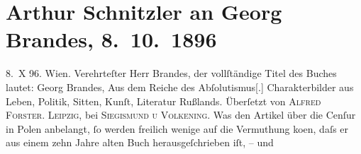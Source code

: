 

         
         \renewcommand{\erwaehntePersonen}{Personen: Hermann Bahr, Georg Brandes, Alfred Forster}
         \renewcommand{\erwaehnteInstitutionen}{Institutionen: Die Zeit. Wiener Wochenschrift, Siegismund u Volkening}
         \renewcommand{\erwaehnteOrte}{Orte: Deutschland, Dänemark, Polen, Wien}
         \renewcommand{\erwaehnteWerke}{Werke: Censur in Polen, Eindrücke aus Russland}
               \section[Arthur Schnitzler an Georg Brandes, 8. 10. 1896]{ Arthur Schnitzler an Georg Brandes, 8. 10. 1896}\nopagebreak{}\rehead{ }\begin{ledgroupsized}[t]{13cm}\normalsize\beginnumbering \toendnotes[C]{\smallbreak\pagebreak[2]} 
\toendnotes[C]{\smallbreak}\pstart
           \raggedleft{}{\pb}8. X 96. Wien.\pend
           \pstart\center{}Verehrteſter Herr Brandes,\pend\pstart
           der vollſtändige Titel des Buches lautet:\pend
           \pstart
           Georg Brandes, Aus dem Reiche des
                     Abſolutismus{[}.{]} Charakterbilder aus  Leben, Politik, Sitten, Kunſt, Literatur
                  Rußlands. Überſetzt von \textsc{Alfred Forster}.\pend
           \pstart
           \textsc{Leipzig}, bei \textsc{Siegismund u Volkening}.\pend
           \pstart
           Was den Artikel über die Cenſur in
                     Polen anbelangt, ſo werden freilich wenige auf die Vermuthung ko{\geminationm}en, daſs er aus einem {\pb}zehn Jahre alten Buch herausgeſchrieben iſt, – und

\end{ledgroupsized}
